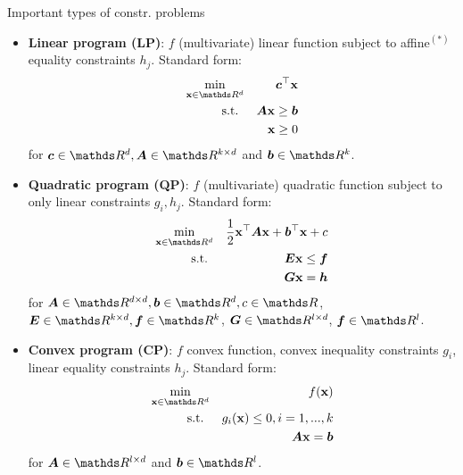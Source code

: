 \begin{vbframe}{Important types of constr. problems}

\vspace*{-0.3cm}

\begin{itemize}
	\item \textbf{Linear program (LP)}: $f$ (multivariate) linear function subject to affine$^{(*)}$ equality constraints $h_j$. Standard form: 
	\vspace*{-0.2cm}
	\begin{eqnarray*}
	\min_{\xv \in \R^d} && \bm{c}^\top\xv\\
	\text{s.t. } && \bm{A}\xv \ge \bm{b} \\
	&& \xv \ge 0
	\end{eqnarray*}
	for $\bm{c}\in \R^d, \bm{A} \in \R^{k \times d}$ and $\bm{b} \in \R^k$. 
	\item \textbf{Quadratic program (QP)}: $f$ (multivariate) quadratic function subject to only linear constraints $g_i, h_j$. Standard form: 
	\vspace*{-0.3cm}
	\begin{eqnarray*}
	\min_{\xv \in \R^d} && \frac{1}{2} \xv^\top \bm{A} \xv + \bm{b}^\top \xv 
	+ c \\
	\text{s.t. } && \bm{E}\xv \le \bm{f} \\
	 && \bm{G}\xv = \bm{h} \\
	\end{eqnarray*}
	for $\bm{A} \in \R^{d \times d}, \bm{b} \in \R^d, c \in \R$, $\bm{E} \in \R^{k \times d}, \bm{f} \in \R^k$, $\bm{G} \in \R^{l \times d}$, $\bm{f} \in \R^l$. 
\end{itemize}
 


\framebreak  

\begin{itemize}
	\item \textbf{Convex program (CP)}: $f$ convex function, convex inequality constraints $g_i$, linear equality constraints $h_j$. Standard form: 
	\vspace*{-0.2cm}
	\begin{eqnarray*}
	\min_{\xv \in \R^d} && \fx\\
	\text{s.t. } && g_i(\xv) \le 0, i = 1, ..., k \\
	&& \bm{A}\xv = \bm{b}
	\end{eqnarray*}
	for $\bm{A} \in \R^{l \times d}$ and $\bm{b} \in \R^l$. 
\end{itemize}


\end{vbframe}
